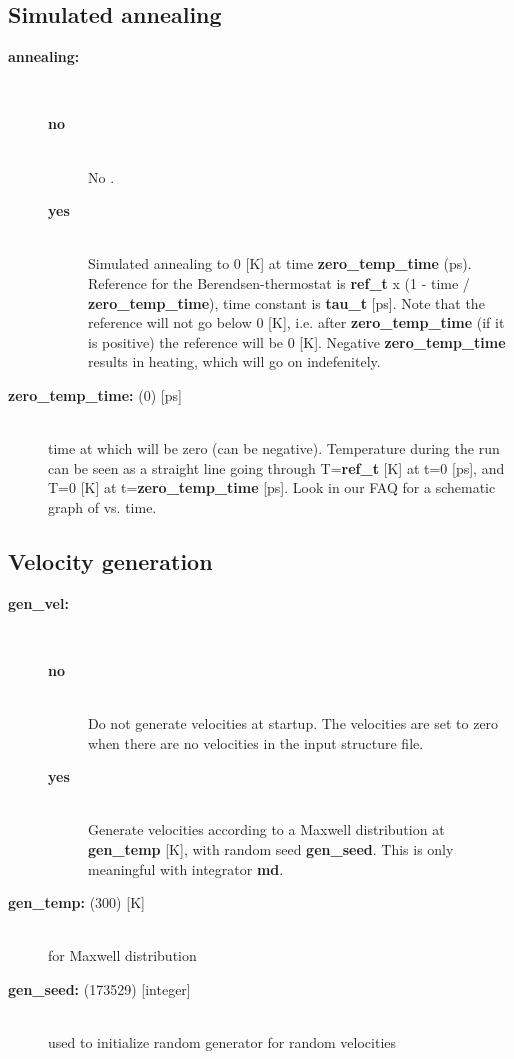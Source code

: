 \subsection{Simulated annealing}
\begin{description}
\item[{\bf annealing:}]\mbox{}\\
\vspace{-2ex}\begin{description}
\item[{\bf no}]\mbox{}\\
No . 
\item[{\bf yes}]\mbox{}\\
Simulated annealing to 0 [K] at time {\bf zero\_temp\_time} (ps).
Reference  for the Berendsen-thermostat is
{\bf ref\_t} x (1 - time / {\bf zero\_temp\_time}),
time constant is {\bf tau\_t} [ps]. Note that the reference 
will not go below 0 [K], i.e. after {\bf zero\_temp\_time} (if it is positive) 
the reference  will be 0 [K]. Negative {\bf zero\_temp\_time} 
results in heating, which will go on indefenitely.
\end{description}
\item[{\bf zero\_temp\_time: }(0) {[ps]}]\mbox{}\\
time at which  will be zero (can be negative). Temperature
during the run can be seen as a straight line going through 
T={\bf ref\_t} [K] at t=0 [ps], and 
T=0 [K] at t={\bf zero\_temp\_time} [ps]. Look in our 
FAQ for a schematic 
graph of  vs. time.
\end{description}

\subsection{Velocity generation}
\begin{description}
\item[{\bf gen\_vel:}]\mbox{}\\
\vspace{-2ex}\begin{description}
\item[{\bf no}]\mbox{}\\
 Do not generate velocities at startup. The velocities are set to zero
when there are no velocities in the input structure file.
\item[{\bf yes}]\mbox{}\\
Generate velocities according to a Maxwell distribution at
 {\bf gen\_temp} [K], with random seed {\bf gen\_seed}. 
This is only meaningful with integrator {\bf md}.
\end{description}
\item[{\bf gen\_temp: }(300) {[K]}]\mbox{}\\
 for Maxwell distribution
\item[{\bf gen\_seed: }(173529) {[integer]}]\mbox{}\\
used to initialize random generator for random velocities
\end{description}

